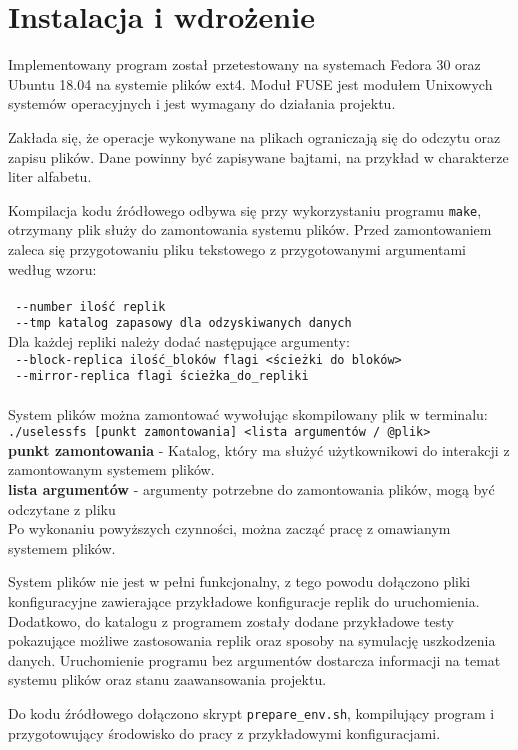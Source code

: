 \chapter{Instalacja i wdrożenie}
\thispagestyle{chapterBeginStyle}

Implementowany program został przetestowany na systemach Fedora 30 oraz Ubuntu 18.04 na systemie plików ext4. Moduł FUSE jest modułem Unixowych systemów operacyjnych i jest wymagany do działania projektu. 

Zakłada się, że operacje wykonywane na plikach ograniczają się do odczytu oraz zapisu plików. Dane powinny być zapisywane bajtami, na przykład w charakterze liter alfabetu.

Kompilacja kodu źródłowego odbywa się przy wykorzystaniu programu \verb|make|, otrzymany plik służy do zamontowania systemu plików. Przed zamontowaniem zaleca się przygotowaniu pliku tekstowego z przygotowanymi argumentami według wzoru:
\\
\\
\verb| --number ilość replik| \\
\verb| --tmp katalog zapasowy dla odzyskiwanych danych| \\

Dla każdej repliki należy dodać następujące argumenty:
\\
\verb| --block-replica ilość_bloków flagi <ścieżki do bloków>| \\
\verb| --mirror-replica flagi ścieżka_do_repliki | \\
\\

System plików można zamontować wywołując skompilowany plik w terminalu:
\\
 \verb|./uselessfs [punkt zamontowania] <lista argumentów / @plik>|
\\
\textbf{punkt zamontowania} - Katalog, który ma służyć użytkownikowi do interakcji z zamontowanym systemem plików.
\\
\textbf{lista argumentów}  - argumenty potrzebne do zamontowania plików, mogą być odczytane z pliku \\
Po wykonaniu powyższych czynności, można zacząć pracę z omawianym systemem plików.

System plików nie jest w pełni funkcjonalny, z tego powodu dołączono pliki konfiguracyjne zawierające przykładowe konfiguracje replik do uruchomienia.
Dodatkowo, do katalogu z programem zostały dodane przykładowe testy pokazujące możliwe zastosowania replik oraz sposoby na symulację uszkodzenia danych. Uruchomienie programu bez argumentów dostarcza informacji na temat systemu plików oraz stanu zaawansowania projektu.

Do kodu źródłowego dołączono skrypt \verb|prepare_env.sh|, kompilujący program i przygotowujący środowisko do pracy z przykładowymi konfiguracjami.

